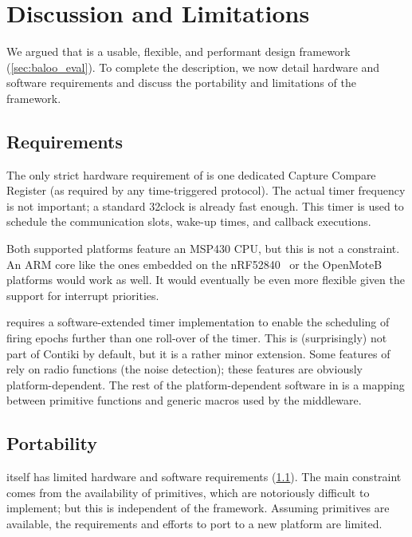 
\section{Discussion and Limitations}
\label{sec:requirements}

We argued that \baloo is a usable, flexible, and performant design framework (\cref{sec:baloo_eval}).
To complete the description, we now detail hardware and software requirements and discuss the portability and limitations of the framework.

\subsection{Requirements}
\label{subsec:requirements}
The only strict hardware requirement of \baloo is one dedicated Capture Compare Register (as required by any time-triggered protocol). The actual timer frequency is not important; a standard 32\kHz clock is already fast enough.
This timer is used to schedule the communication slots, wake-up times, and callback executions.

Both supported platforms feature an MSP430 CPU, but this is not a constraint. An ARM core like the ones embedded on the nRF52840~\cite{nRF52840} or the OpenMoteB~\cite{OpenMoteB} platforms would work as well. It would eventually be even more flexible given the support for interrupt priorities.

\baloo requires a software-extended timer implementation to enable the scheduling of firing epochs further than one roll-over of the timer. This is (surprisingly) not part of Contiki by default, but it is a rather minor extension.
%
Some features of \baloo rely on radio functions (\eg the noise detection); these features are obviously platform-dependent.
%
The rest of the platform-dependent software in \baloo is a mapping between \ST primitive functions and generic macros used by the middleware.

\subsection{Portability}
\baloo itself has limited hardware and software requirements (\cref{subsec:requirements}). The main constraint comes from the availability of \ST primitives, which are notoriously difficult to implement; but this is independent of the framework.
Assuming \ST primitives are available, the requirements and efforts to port \baloo to a new platform are limited.

